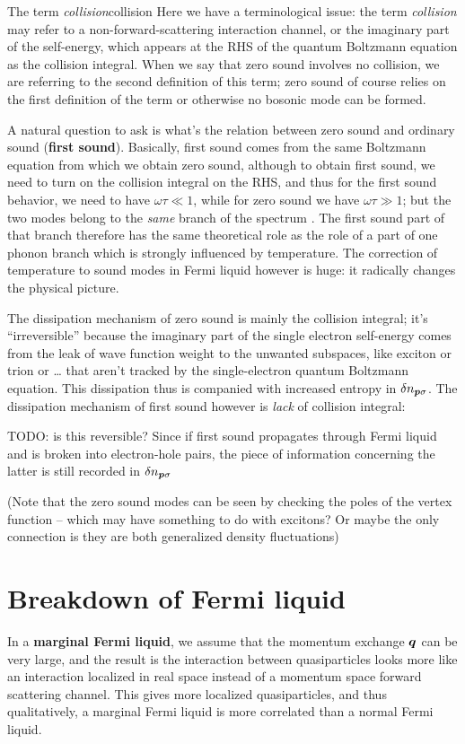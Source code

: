 \documentclass[hyperref, a4paper]{article}
\newcommand*{\concept}[1]{{\textbf{#1}}}
\newcommand*{\term}[1]{\textit{#1}}
\begin{document}
\begin{infobox}{The term \term{collision}}{collision}
    Here we have a terminological issue: 
    the term \term{collision} may refer to 
    a non-forward-scattering interaction channel, 
    or the imaginary part of the self-energy,
    which appears at the RHS of the quantum Boltzmann equation 
    as the collision integral.
    When we say that zero sound involves no collision, 
    we are referring to the second definition of this term; 
    zero sound of course relies on the first definition of the term 
    or otherwise no bosonic mode can be formed.
\end{infobox}

A natural question to ask is 
what's the relation between zero sound 
and ordinary sound (\concept{first sound}).
Basically, first sound comes from the same Boltzmann equation 
from which we obtain zero sound,
although to obtain first sound, 
we need to turn on the collision integral on the RHS, 
and thus for the first sound behavior, we need to have $\omega \tau \ll 1$,
while for zero sound we have $\omega \tau \gg 1$;
but the two modes belong to the \emph{same} branch of the spectrum
\cite{khalatnikov1958dispersion}.
The first sound part of that branch 
therefore has the same theoretical role 
as the role of a part of one phonon branch 
which is strongly influenced by temperature.
The correction of temperature to sound modes in Fermi liquid however is huge:
it radically changes the physical picture.

The dissipation mechanism of zero sound 
is mainly the collision integral;
it's ``irreversible''
because the imaginary part of the single electron self-energy 
comes from the leak of wave function weight 
to the unwanted subspaces, 
like exciton or trion or \dots 
that aren't tracked by the single-electron quantum Boltzmann equation.
This dissipation thus is companied with 
increased entropy in $\var{n_{\vb*{p} \sigma}}$.
The dissipation mechanism of first sound 
however is \emph{lack} of collision integral:

TODO: is this reversible? 
Since if first sound propagates through Fermi liquid 
and is broken into electron-hole pairs, 
the piece of information concerning the latter 
is still recorded in $\var{n_{\vb*{p} \sigma}}$

(Note that the zero sound modes can be seen by checking the poles of the vertex function 
-- which may have something to do with excitons? 
Or maybe the only connection is they are both generalized density fluctuations)

\section{Breakdown of Fermi liquid}

In a \concept{marginal Fermi liquid}, 
we assume that the momentum exchange $\vb*{q}$ can be very large, 
and the result is the interaction between quasiparticles 
looks more like an interaction localized in real space 
instead of a momentum space forward scattering channel.
This gives more localized quasiparticles,
and thus qualitatively, 
a marginal Fermi liquid is more correlated than 
a normal Fermi liquid.

\printbibliography
\end{document}
